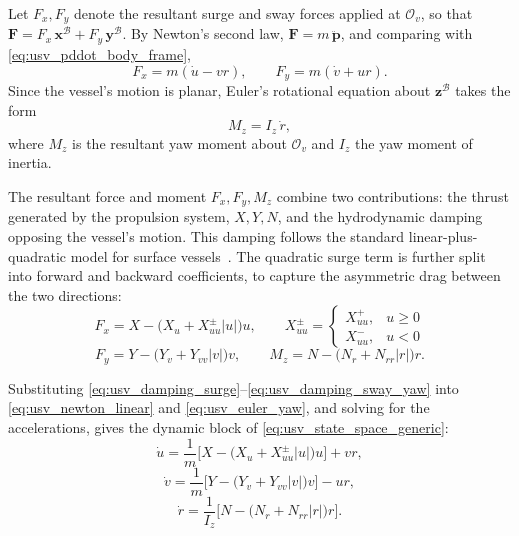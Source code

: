 Let $F_x, F_y$ denote the resultant surge and sway forces applied at $\mathcal{O}_v$, so that $\mathbf{F} = F_x\,\mathbf{x}^{\mathcal{B}} + F_y\,\mathbf{y}^{\mathcal{B}}$. By Newton's second law, $\mathbf{F} = m\,\ddot{\mathbf{p}}$, and comparing with \eqref{eq:usv_pddot_body_frame},
\begin{equation}
    F_x = m(\dot{u} - vr), \qquad F_y = m(\dot{v} + ur).
    \label{eq:usv_newton_linear}
\end{equation}
Since the vessel's motion is planar, Euler's rotational equation about $\mathbf{z}^{\mathcal{B}}$ takes the form
\begin{equation}
    M_z = I_z\,\dot{r},
    \label{eq:usv_euler_yaw}
\end{equation}
where $M_z$ is the resultant yaw moment about $\mathcal{O}_v$ and $I_z$ the yaw moment of inertia.

The resultant force and moment $F_x, F_y, M_z$ combine two contributions: the thrust generated by the propulsion system, $X, Y, N$, and the hydrodynamic damping opposing the vessel's motion. This damping follows the standard linear-plus-quadratic model for surface vessels~\cite{fossenHandbookMarineCraft2011}. The quadratic surge term is further split into forward and backward coefficients, to capture the asymmetric drag between the two directions:
\begin{equation}
    F_x = X - \big(X_u + X_{uu}^{\pm}|u|\big)u, \qquad
    X_{uu}^{\pm} = \begin{cases} X_{uu}^{+}, & u \geq 0 \\ X_{uu}^{-}, & u < 0 \end{cases}
    \label{eq:usv_damping_surge}
\end{equation}
\begin{equation}
    F_y = Y - \big(Y_v + Y_{vv}|v|\big)v, \qquad
    M_z = N - \big(N_r + N_{rr}|r|\big)r.
    \label{eq:usv_damping_sway_yaw}
\end{equation}

Substituting \eqref{eq:usv_damping_surge}--\eqref{eq:usv_damping_sway_yaw} into \eqref{eq:usv_newton_linear} and \eqref{eq:usv_euler_yaw}, and solving for the accelerations, gives the dynamic block of \eqref{eq:usv_state_space_generic}:
\begin{equation}
    \dot{u} = \frac{1}{m}\Big[X - \big(X_u + X_{uu}^{\pm}|u|\big)u\Big] + vr,
    \label{eq:usv_udot}
\end{equation}
\begin{equation}
    \dot{v} = \frac{1}{m}\Big[Y - \big(Y_v + Y_{vv}|v|\big)v\Big] - ur,
    \label{eq:usv_vdot}
\end{equation}
\begin{equation}
    \dot{r} = \frac{1}{I_z}\Big[N - \big(N_r + N_{rr}|r|\big)r\Big].
    \label{eq:usv_rdot}
\end{equation}

